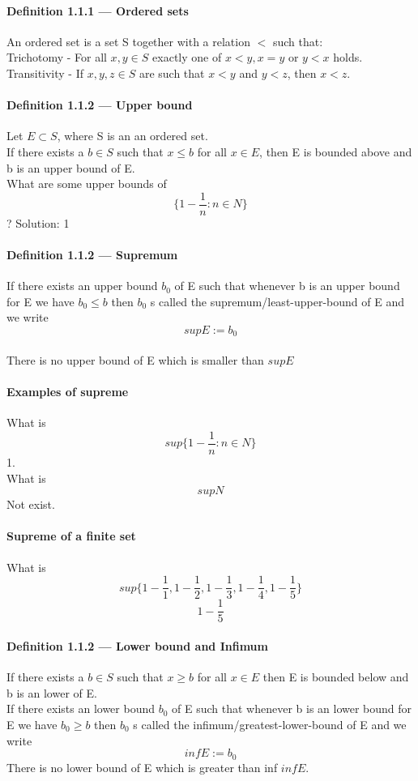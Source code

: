 \documentclass{article}
\begin{document}
\paragraph{Definition 1.1.1 — Ordered sets}
An ordered set is a set S together with a relation $<$ such that:\\
    Trichotomy - For all $x,y\in S$  exactly one of $x<y,x=y$ or $y<x$ holds.\\
    Transitivity - If $x,y,z\in S$  are such that $x<y$ and $y<z$, then $x<z$.
\paragraph{Definition 1.1.2 — Upper bound}
Let $E\subset S$, where S is an an ordered set.\\
If there exists a $b\in S$ such that $x\leq b$ for all $x\in E$, then E is bounded above and b is an upper bound of E.\\
What are some upper bounds of $$\{1-\frac{1}{n}:n\in N\}$$?
Solution: 1\\
\paragraph{Definition 1.1.2 — Supremum}
If there exists an upper bound $b_0$ of E such that whenever b is an upper bound for E we have $b_0\leq b$ then $b_0$ s called the supremum/least-upper-bound of E and we write $$supE:=b_0$$\\
There is no upper bound of E which is smaller than $supE$\\
\paragraph{Examples of supreme}
What is $$sup\{1-\frac{1}{n}:n\in N\}$$
1.\\
What is $$supN$$
Not exist.
\paragraph{Supreme of a finite set}
What is $$sup\{1-\frac{1}{1},1-\frac{1}{2},1-\frac{1}{3},1-\frac{1}{4},1-\frac{1}{5}\}$$
$$1-\frac{1}{5}$$
\paragraph{Definition 1.1.2 — Lower bound and Infimum}
If there exists a $b\in S$ such that $x\ge b$ for all $x\in E$ then E is bounded below and b is an lower of E.\\
If there exists an lower bound $b_0$ of E such that whenever b is an lower bound for E we have $b_0\ge b$ then $b_0$ s called the infimum/greatest-lower-bound of E and we write $$infE:=b_0$$
There is no lower bound of E which is greater than inf $infE$.
\end{document}
